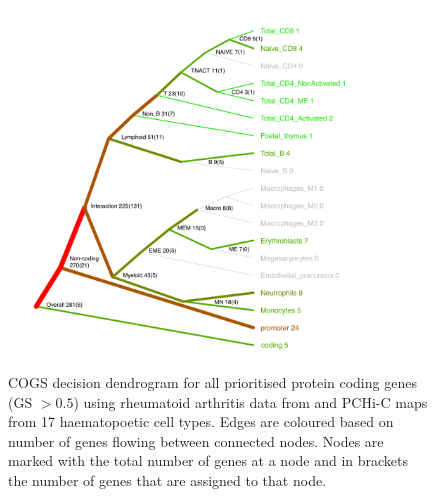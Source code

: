 \documentclass[a4paper,11pt]{report}
\begin{document}
\begin{figure}[ht]
\centering
\includegraphics[width=0.85\textwidth]{RA_dend.pdf}
\caption{COGS decision dendrogram for all prioritised protein coding genes (GS $> 0.5$) using rheumatoid arthritis data from \cite{Okada2014-um} and PCHi-C maps from 17 haematopoetic cell types. Edges are coloured based on number of genes flowing between connected nodes. Nodes are marked with the total number of genes at a node and in brackets the number of genes that are assigned to that node.}
\label{fig:RA_dend}
\end{figure}

 
\end{document}
